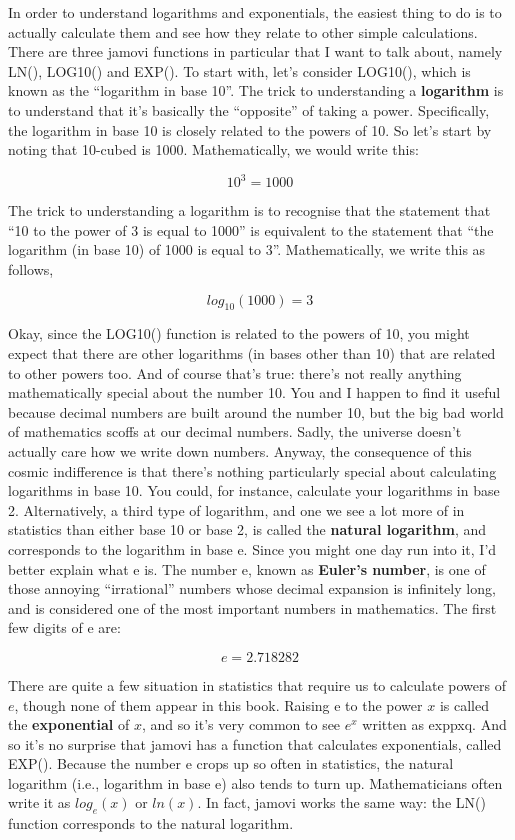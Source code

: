 \documentclass[
]{book}
\begin{document}
In order to understand logarithms and exponentials, the easiest thing to do is to actually calculate them and see how they relate to other simple calculations. There are three jamovi functions in particular that I want to talk about, namely LN(), LOG10() and EXP(). To start with, let's consider LOG10(), which is known as the ``logarithm in base 10''. The trick to understanding a \textbf{logarithm} is to understand that it's basically the ``opposite'' of taking a power. Specifically, the logarithm in base 10 is closely related to the powers of 10. So let's start by noting that 10-cubed is 1000. Mathematically, we would write this:

\[10^3=1000\]

The trick to understanding a logarithm is to recognise that the statement that ``10 to the power of 3 is equal to 1000'' is equivalent to the statement that ``the logarithm (in base 10) of 1000 is equal to 3''. Mathematically, we write this as follows,

\[log_{10}(1000)=3\]

Okay, since the LOG10() function is related to the powers of 10, you might expect that there are other logarithms (in bases other than 10) that are related to other powers too. And of course that's true: there's not really anything mathematically special about the number 10. You and I happen to find it useful because decimal numbers are built around the number 10, but the big bad world of mathematics scoffs at our decimal numbers. Sadly, the universe doesn't actually care how we write down numbers. Anyway, the consequence of this cosmic indifference is that there's nothing particularly special about calculating logarithms in base 10. You could, for instance, calculate your logarithms in base 2. Alternatively, a third type of logarithm, and one we see a lot more of in statistics than either base 10 or base 2, is called the \textbf{natural logarithm}, and corresponds to the logarithm in base e. Since you might one day run into it, I'd better explain what e is. The number e, known as \textbf{Euler's number}, is one of those annoying ``irrational'' numbers whose decimal expansion is infinitely long, and is considered one of the most important numbers in mathematics. The first few digits of e are:

\[e = 2.718282 \]

There are quite a few situation in statistics that require us to calculate powers of \(e\), though none of them appear in this book. Raising e to the power \(x\) is called the \textbf{exponential} of \(x\), and so it's very common to see \(e^x\) written as exppxq. And so it's no surprise that jamovi has a function that calculates exponentials, called EXP(). Because the number e crops up so often in statistics, the natural logarithm (i.e., logarithm in base e) also tends to turn up. Mathematicians often write it as \(log_e(x)\) or \(ln(x)\). In fact, jamovi works the same way: the LN() function corresponds to the natural logarithm.
\end{document}
